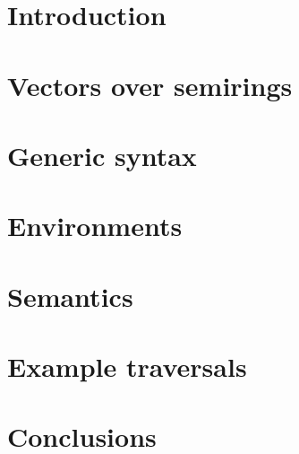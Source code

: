 \documentclass[runningheads]{llncs}
\begin{document}
\section{Introduction}\label{sec:intro}


\section{Vectors over semirings}\label{sec:algebra}


\section{Generic syntax}\label{sec:syntax}


\section{Environments}\label{sec:env}


\section{Semantics}\label{sec:semantics}


\section{Example traversals}\label{sec:examples}


\section{Conclusions}\label{sec:conc}
%
%
%


\end{document}
